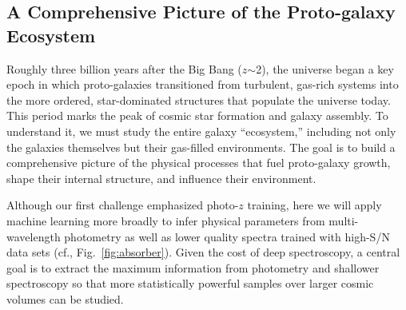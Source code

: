 
\subsection{A Comprehensive Picture of the Proto-galaxy Ecosystem}
\label{sec:galaxies}

%
%
%
%

Roughly three billion years after the Big Bang ($z$$\sim$2), the universe began a key epoch in which proto-galaxies
transitioned from turbulent, gas-rich systems into the more ordered, star-dominated structures that populate the
universe today.  This period marks the peak of cosmic star formation and galaxy assembly.   To understand it, we must
study the entire galaxy ``ecosystem,'' including not only the galaxies themselves but their gas-filled environments.
The goal is to build a comprehensive picture of the physical processes that fuel proto-galaxy growth, shape their
internal structure, and influence their environment.

Although our first challenge emphasized photo-$z$ training, here we will apply machine learning more broadly to infer
physical parameters from multi-wavelength photometry as well as lower quality spectra trained with high-S/N data sets 
(cf., Fig.~\ref{fig:absorber}).  Given the cost of deep spectroscopy, a central goal is to extract the maximum
information from photometry and shallower spectroscopy so that more statistically powerful samples over larger cosmic
volumes can be studied.

